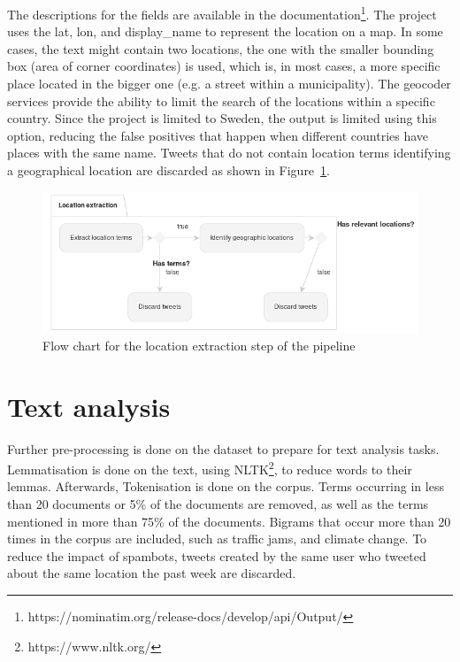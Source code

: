 The descriptions for the fields are available in the
documentation\footnote{https://nominatim.org/release-docs/develop/api/Output/}. The project uses
the lat, lon, and display\_name to represent the location on a map. In some cases, the text might
contain two locations, the one with the smaller bounding box (area of corner coordinates) is used,
which is, in most cases, a more specific place located in the bigger one (e.g. a street within a
municipality). The geocoder services provide the ability to limit the search of the locations
within a specific country. Since the project is limited to Sweden, the output is limited using
this option, reducing the false positives that happen when different countries have places with
the same name. Tweets that do not contain location terms identifying a geographical
location are discarded as shown in Figure~\ref{fig:flow_chart_location_extraction}.

\begin{figure}[H]
  \begin{center}
    \includegraphics[width=\columnwidth]{./images/location_extraction.png}
  \end{center}
  \caption{Flow chart for the location extraction step of the pipeline}
  \label{fig:flow_chart_location_extraction}
\end{figure}


\section{Text analysis}

Further pre-processing is done on the dataset to prepare for text analysis tasks. Lemmatisation is
done on the text, using \ac{NLTK}\footnote{https://www.nltk.org/}, to reduce words to their lemmas.
Afterwards, Tokenisation is done on the corpus. Terms occurring in less than 20 documents or 5\% of
the documents are removed, as well as the terms mentioned in more than 75\% of the documents.
Bigrams that occur more than 20 times in the corpus are included, such as traffic jams, and climate
change. To reduce the impact of spambots, tweets created by the same user who tweeted about the same location the past
week are discarded.

